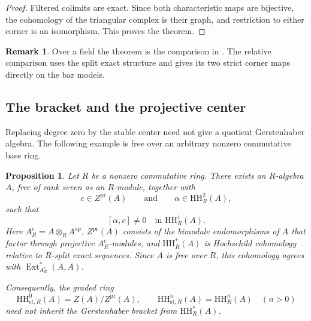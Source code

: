\documentclass[12pt,a4paper,english,reqno]{amsart}
\numberwithin{equation}{section}
\theoremstyle{plain}
\newtheorem{proposition}[theorem]{Proposition}
\theoremstyle{definition}
\newtheorem{remark}[theorem]{Remark}
\begin{document}
\begin{proof}
Filtered colimits are exact. Since both characteristic
maps are bijective, the cohomology of the triangular
complex is their graph, and restriction to either corner
is an isomorphism. This proves the theorem.
\end{proof}

\begin{remark}
Over a field the theorem is the comparison in
\cite[Theorem~9.6 and Proposition~9.7]{ChenLiWangBInfinity}.
The relative comparison uses the split exact structure and
gives its two strict corner maps directly on the bar models.
\end{remark}

\subsection{The bracket and the projective center}
\label{sec:stable-center-bracket-counterexample}

Replacing degree zero by the stable center need not give a quotient
Gerstenhaber algebra.  The following example is free over an arbitrary
nonzero commutative base ring.

\begin{proposition}
\label{prop:projective-center-not-gerstenhaber-ideal}
Let $R$ be a nonzero commutative ring.  There exists an $R$-algebra $A$,
free of rank seven as an $R$-module, together with
\[
 c\in Z^{\mathrm{pr}}(A)
 \qquad\text{and}\qquad
 \alpha\in\mathrm{HH}^{2}_R(A),
\]
such that
\[
 [\alpha,c]\ne 0
 \quad\text{in }\mathrm{HH}^{1}_R(A).
\]
Here $A^e_R=A\otimes_R A^{\mathrm{op}}$,
$Z^{\mathrm{pr}}(A)$ consists of the bimodule endomorphisms of $A$ that
factor through projective $A^e_R$-modules, and
$\mathrm{HH}^{*}_R(A)$ is Hochschild cohomology relative to
$R$-split exact sequences.  Since $A$ is free over $R$, this cohomology agrees with
$\operatorname{Ext}^{*}_{A^e_R}(A,A)$.

Consequently, the graded ring
\[
 \mathrm{HH}^{0}_{\mathrm{st},R}(A)
     =Z(A)/Z^{\mathrm{pr}}(A),
 \qquad
 \mathrm{HH}^{n}_{\mathrm{st},R}(A)
     =\mathrm{HH}^{n}_R(A)\quad(n>0)
\]
need not inherit the Gerstenhaber bracket from
$\mathrm{HH}^{*}_R(A)$.
\end{proposition}
\end{document}
